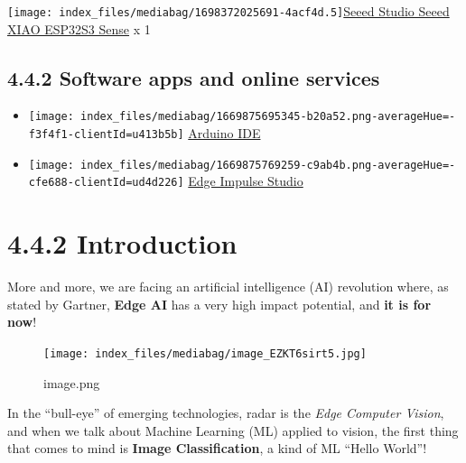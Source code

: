 \documentclass[
  letterpaper,
  DIV=11,
  numbers=noendperiod]{scrreprt}
\providecommand{\tightlist}{%
  \setlength{\itemsep}{0pt}\setlength{\parskip}{0pt}}\usepackage{longtable,booktabs,array}
\begin{document}
\texttt{[image: index\_files/mediabag/1698372025691-4acf4d.5]}\href{https://www.hackster.io/seeed/products/seeed-xiao-esp32s3-sense?ref=project-cb42ae}{Seeed
Studio Seeed XIAO ESP32S3 Sense} x 1

\hypertarget{software-apps-and-online-services}{%
\subsection*{4.4.2 Software apps and online
services}\label{software-apps-and-online-services}}

\begin{itemize}
\tightlist
\item
  \texttt{[image: index\_files/mediabag/1669875695345-b20a52.png-averageHue=-f3f4f1-clientId=u413b5b]}
  \href{https://www.hackster.io/arduino/products/arduino-ide?ref=project-958fd2}{Arduino
  IDE}
\item
  \texttt{[image: index\_files/mediabag/1669875769259-c9ab4b.png-averageHue=-cfe688-clientId=ud4d226]}
  \href{https://www.hackster.io/EdgeImpulse/products/edge-impulse-studio?ref=project-958fd2}{Edge
  Impulse Studio}
\end{itemize}

\hypertarget{introduction-2}{%
\section*{4.4.2 Introduction}\label{introduction-2}}


More and more, we are facing an artificial intelligence (AI) revolution
where, as stated by Gartner, \textbf{Edge AI} has a very high impact
potential, and \textbf{it is for now}!

\begin{figure}[H]

{\centering \texttt{[image: index\_files/mediabag/image\_EZKT6sirt5.jpg]}

}

\caption{image.png}

\end{figure}

In the ``bull-eye'' of emerging technologies, radar is the \emph{Edge
Computer Vision}, and when we talk about Machine Learning (ML) applied
to vision, the first thing that comes to mind is \textbf{Image
Classification}, a kind of ML ``Hello World''!
\end{document}
